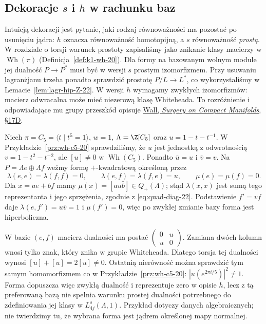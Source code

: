 \subsection*{Dekoracje $s$ i $h$ w rachunku baz}
\label{sec:dekoracje-L-22}
Intuicją dekoracji jest pytanie, jaki rodzaj
równoważności ma pozostać po usunięciu jądra:
$h$ oznacza równoważność homotopijną, a $s$
równoważność \emph{prostą}. W rozdziale o torsji
warunek prostoty zapisaliśmy jako znikanie klasy
macierzy w $\operatorname{Wh}(\pi)$
(Definicja~\ref{def:k1-wh-20}). Dla formy
na bazowanym wolnym module jej dualność
$P\to P^*$ musi być w wersji $s$ prostym
izomorfizmem. Przy usuwaniu lagranżjanu
trzeba ponadto sprawdzić prostotę
$P/L\to L^*$, co wykorzystaliśmy w
Lemacie~\ref{lem:lagr-hip-Z-22}.
W wersji $h$ wymagamy zwykłych izomorfizmów:
macierz odwracalna może mieć niezerową klasę
Whiteheada. To rozróżnienie i odpowiadające
mu grupy przeszkód opisuje
\href{https://webhomes.maths.ed.ac.uk/~v1ranick/books/scm.pdf}
{Wall, \emph{Surgery on Compact Manifolds}, §17D}.

\begin{przyklad}
\label{prz:dekoracje-C5-22}
Niech $\pi=C_5=\langle t\mid t^5=1\rangle$,
$w=1$, $\Lambda=\Z[C_5]$ oraz
$u=1-t-t^{-1}$. W
Przykładzie~\ref{prz:wh-c5-20} sprawdziliśmy,
że $u$ jest jednostką z odwrotnością
$v=1-t^2-t^{-2}$, ale $[u]\ne0$ w
$\operatorname{Wh}(C_5)$. Ponadto $\bar u=u$
i $\bar v=v$. Na $P=\Lambda e\oplus\Lambda f$
weźmy formę $+$-kwadratową określoną przez
\[
 \lambda(e,e)=\lambda(f,f)=0,\qquad
 \lambda(e,f)=\lambda(f,e)=u,\qquad
 \mu(e)=\mu(f)=0.
\]
Dla $x=ae+bf$ mamy
$\mu(x)=[a u\bar b]\in Q_+(\Lambda)$;
stąd $\lambda(x,x)$ jest sumą tego
reprezentanta i jego sprzężenia, zgodnie z
\eqref{eq:quad-diag-22}. Podstawienie
$f'=vf$ daje $\lambda(e,f')=u\bar v=1$
i $\mu(f')=0$, więc po zwykłej zmianie bazy
forma jest hiperboliczna.

W bazie $(e,f)$ macierz dualności ma postać
$\left(\begin{smallmatrix}0&u\\u&0\end{smallmatrix}\right)$.
Zamiana dwóch kolumn wnosi tylko znak,
który znika w grupie Whiteheada. Dlatego
torsja tej dualności wynosi
$[u]+[u]=2[u]\ne0$.
Ostatnią nierówność można sprawdzić tym
samym homomorfizmem co w
Przykładzie~\ref{prz:wh-c5-20}:
$|u(e^{2\pi i/5})|^2\ne1$.
Forma dopuszcza więc zwykłą dualność i
reprezentuje zero w opisie $h$, lecz z tą
preferowaną bazą nie spełnia warunku prostej
dualności potrzebnego do zdefiniowania jej
klasy w $L^s_{4j}(\Lambda,1)$.
Przykład dotyczy danych algebraicznych;
nie twierdzimy tu, że wybrana forma jest
jądrem określonej mapy normalnej.
\end{przyklad}

